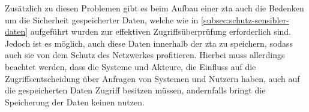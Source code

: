 Zusätzlich zu diesen Problemen gibt es beim Aufbau einer \ac{zta} auch die Bedenken um die Sicherheit gespeicherter Daten, welche wie in \autoref{subsec:schutz-sensibler-daten} aufgeführt wurden zur effektiven Zugriffsüberprüfung erforderlich sind.
Jedoch ist es möglich, auch diese Daten innerhalb der \ac{zta} zu speichern, sodass auch sie von dem Schutz des Netzwerkes profitieren.
Hierbei muss allerdings beachtet werden, dass die Systeme und Akteure, die Einfluss auf die Zugriffsentscheidung über Anfragen von Systemen und Nutzern haben, auch auf die gespeicherten Daten Zugriff besitzen müssen, andernfalls bringt die Speicherung der Daten keinen nutzen.


